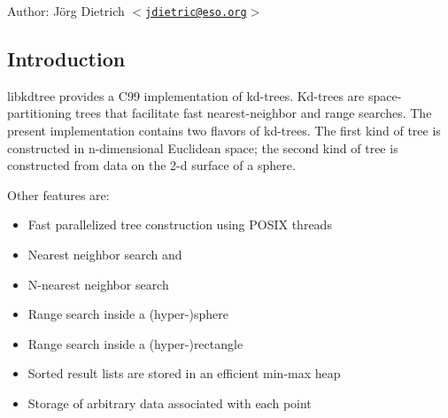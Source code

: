 \begin{Desc}
\item[Author:]Jörg Dietrich $<$\href{mailto:jdietric@eso.org}{\tt jdietric@eso.org}$>$\end{Desc}
\hypertarget{index_Introduction}{}\subsection{Introduction}\label{index_Introduction}
libkdtree provides a C99 implementation of kd-trees. Kd-trees are space-partitioning trees that facilitate fast nearest-neighbor and range searches. The present implementation contains two flavors of kd-trees. The first kind of tree is constructed in n-dimensional Euclidean space; the second kind of tree is constructed from data on the 2-d surface of a sphere.

Other features are:\begin{itemize}
\item Fast parallelized tree construction using POSIX threads\item Nearest neighbor search and\item N-nearest neighbor search\item Range search inside a (hyper-)sphere\item Range search inside a (hyper-)rectangle\item Sorted result lists are stored in an efficient min-max heap\item Storage of arbitrary data associated with each point \end{itemize}
